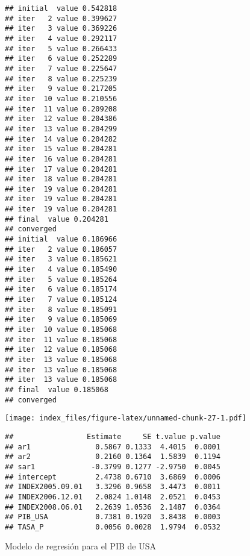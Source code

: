 \documentclass[
]{book}
\newenvironment{Shaded}{\begin{snugshade}}{\end{snugshade}}
\newcommand{\NormalTok}[1]{#1}
\newcommand{\SpecialCharTok}[1]{\textcolor[rgb]{0.00,0.00,0.00}{#1}}
\begin{document}
\begin{verbatim}
## initial  value 0.542818 
## iter   2 value 0.399627
## iter   3 value 0.369226
## iter   4 value 0.292117
## iter   5 value 0.266433
## iter   6 value 0.252289
## iter   7 value 0.225647
## iter   8 value 0.225239
## iter   9 value 0.217205
## iter  10 value 0.210556
## iter  11 value 0.209208
## iter  12 value 0.204386
## iter  13 value 0.204299
## iter  14 value 0.204282
## iter  15 value 0.204281
## iter  16 value 0.204281
## iter  17 value 0.204281
## iter  18 value 0.204281
## iter  19 value 0.204281
## iter  19 value 0.204281
## iter  19 value 0.204281
## final  value 0.204281 
## converged
## initial  value 0.186966 
## iter   2 value 0.186057
## iter   3 value 0.185621
## iter   4 value 0.185490
## iter   5 value 0.185264
## iter   6 value 0.185174
## iter   7 value 0.185124
## iter   8 value 0.185091
## iter   9 value 0.185069
## iter  10 value 0.185068
## iter  11 value 0.185068
## iter  12 value 0.185068
## iter  13 value 0.185068
## iter  13 value 0.185068
## iter  13 value 0.185068
## final  value 0.185068 
## converged
\end{verbatim}

\texttt{[image: index\_files/figure-latex/unnamed-chunk-27-1.pdf]}

\begin{Shaded}
\end{Shaded}

\begin{verbatim}
##                 Estimate     SE t.value p.value
## ar1               0.5867 0.1333  4.4015  0.0001
## ar2               0.2160 0.1364  1.5839  0.1194
## sar1             -0.3799 0.1277 -2.9750  0.0045
## intercept         2.4738 0.6710  3.6869  0.0006
## INDEX2005.09.01   3.3296 0.9658  3.4473  0.0011
## INDEX2006.12.01   2.0824 1.0148  2.0521  0.0453
## INDEX2008.06.01   2.2639 1.0536  2.1487  0.0364
## PIB_USA           0.7381 0.1920  3.8438  0.0003
## TASA_P            0.0056 0.0028  1.9794  0.0532
\end{verbatim}

Modelo de regresión para el PIB de USA
\end{document}
